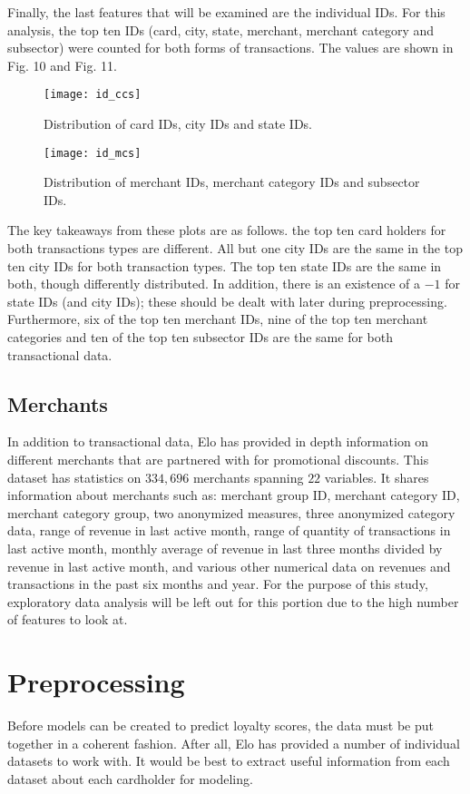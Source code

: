 \documentclass[journal, a4paper]{IEEEtran}
\begin{document}
Finally, the last features that will be examined are the individual IDs. For this analysis, the top ten IDs (card, city, state, merchant, merchant category and subsector) were counted for both forms of transactions. The values are shown in Fig. 10 and Fig. 11. 
 \begin{figure}[bt] \texttt{[image: id\_ccs]} \caption{Distribution of card IDs, city IDs and state IDs.} \end{figure} 
 \begin{figure}[bt] \texttt{[image: id\_mcs]} \caption{Distribution of merchant IDs, merchant category IDs and subsector IDs.} \end{figure} 
The key takeaways from these plots are as follows. the top ten card holders for both transactions types are different. All but one city IDs are the same in the top ten city IDs for both transaction types. The top ten state IDs are the same in both, though differently distributed. In addition, there is an existence of a $-1$ for state IDs (and city IDs); these should be dealt with later during preprocessing. Furthermore, six of the top ten merchant IDs, nine of the top ten merchant categories and ten of the top ten subsector IDs are the same for both transactional data. 

\subsection{Merchants}
In addition to transactional data, Elo has provided in depth information on different merchants that are partnered with for promotional discounts. This dataset has statistics on $334, 696$ merchants spanning $22$ variables. It shares information about merchants such as: merchant group ID, merchant category ID, merchant category group, two anonymized measures, three anonymized category data, range of revenue in last active month, range of quantity of transactions in last active month, monthly average of revenue in last three months divided by revenue in last active month, and various other numerical data on revenues and transactions in the past six months and year. For the purpose of this study, exploratory data analysis will be left out for this portion due to the high number of features to look at.

\section{Preprocessing}
Before models can be created to predict loyalty scores, the data must be put together in a coherent fashion. After all, Elo has provided a number of individual datasets to work with. It would be best to extract useful information from each dataset about each cardholder for modeling. 
\end{document}
